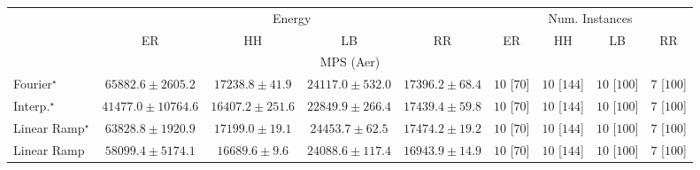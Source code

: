 \begin{tabular}{l|cccc|cccc|}
\toprule
& \multicolumn{4}{c|}{Energy} & \multicolumn{4}{c|}{Num. Instances} \\
            & ER & HH & LB & RR & ER & HH & LB & RR \\
\midrule
\multicolumn{9}{c}{\rule{0pt}{8pt}MPS (Aer)} \\
\midrule
Fourier$^\star$ & {\cellcolor[HTML]{85288D}} \color[HTML]{F1F1F1} $65882.6\pm 2605.2$ & {\cellcolor[HTML]{C8DAEA}} \color[HTML]{000000} $17238.8\pm 41.9$ & {\cellcolor[HTML]{B1C9E1}} \color[HTML]{000000} $24117.0\pm 532.0$ & {\cellcolor[HTML]{C7D9E9}} \color[HTML]{000000} $17396.2\pm 68.4$ & {\cellcolor[HTML]{49006A}} \color[HTML]{F1F1F1} $10$ [$70$] & {\cellcolor[HTML]{49006A}} \color[HTML]{F1F1F1} $10$ [$144$] & {\cellcolor[HTML]{49006A}} \color[HTML]{F1F1F1} $10$ [$100$] & {\cellcolor[HTML]{FFF7F3}} \color[HTML]{000000} $7$ [$100$] \\
Interp.$^\star$ & {\cellcolor[HTML]{8C91C4}} \color[HTML]{F1F1F1} $41477.0\pm 10764.6$ & {\cellcolor[HTML]{CBDCEB}} \color[HTML]{000000} $16407.2\pm 251.6$ & {\cellcolor[HTML]{B5CCE3}} \color[HTML]{000000} $22849.9\pm 266.4$ & {\cellcolor[HTML]{C7D9E9}} \color[HTML]{000000} $17439.4\pm 59.8$ & {\cellcolor[HTML]{49006A}} \color[HTML]{F1F1F1} $10$ [$70$] & {\cellcolor[HTML]{49006A}} \color[HTML]{F1F1F1} $10$ [$144$] & {\cellcolor[HTML]{49006A}} \color[HTML]{F1F1F1} $10$ [$100$] & {\cellcolor[HTML]{FFF7F3}} \color[HTML]{000000} $7$ [$100$] \\
Linear Ramp$^\star$ & {\cellcolor[HTML]{863293}} \color[HTML]{F1F1F1} $63828.8\pm 1920.9$ & {\cellcolor[HTML]{C8DAEA}} \color[HTML]{000000} $17199.0\pm 19.1$ & {\cellcolor[HTML]{B0C9E1}} \color[HTML]{000000} $24453.7\pm 62.5$ & {\cellcolor[HTML]{C7D9E9}} \color[HTML]{000000} $17474.2\pm 19.2$ & {\cellcolor[HTML]{49006A}} \color[HTML]{F1F1F1} $10$ [$70$] & {\cellcolor[HTML]{49006A}} \color[HTML]{F1F1F1} $10$ [$144$] & {\cellcolor[HTML]{49006A}} \color[HTML]{F1F1F1} $10$ [$100$] & {\cellcolor[HTML]{FFF7F3}} \color[HTML]{000000} $7$ [$100$] \\
Linear Ramp & {\cellcolor[HTML]{894CA2}} \color[HTML]{F1F1F1} $58099.4\pm 5174.1$ & {\cellcolor[HTML]{CADBEB}} \color[HTML]{000000} $16689.6\pm 9.6$ & {\cellcolor[HTML]{B2CAE1}} \color[HTML]{000000} $24088.6\pm 117.4$ & {\cellcolor[HTML]{C9DBEA}} \color[HTML]{000000} $16943.9\pm 14.9$ & {\cellcolor[HTML]{49006A}} \color[HTML]{F1F1F1} $10$ [$70$] & {\cellcolor[HTML]{49006A}} \color[HTML]{F1F1F1} $10$ [$144$] & {\cellcolor[HTML]{49006A}} \color[HTML]{F1F1F1} $10$ [$100$] & {\cellcolor[HTML]{FFF7F3}} \color[HTML]{000000} $7$ [$100$] \\

\end{tabular}
